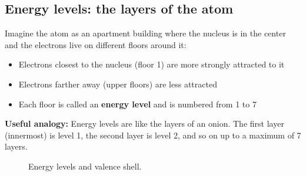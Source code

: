 \subsection{Energy levels: the layers of the atom}
\begin{minipage}{0.45\textwidth}
    Imagine the atom as an apartment building where the nucleus is in the center and the electrons live on different floors around it:
    \begin{itemize}
        \item Electrons closest to the nucleus (floor 1) are more strongly attracted to it
        \item Electrons farther away (upper floors) are less attracted
        \item Each floor is called an \textbf{energy level} and is numbered from 1 to 7
    \end{itemize}
    \begin{remark}
        \textbf{Useful analogy:} Energy levels are like the layers of an onion. The first layer (innermost) is level 1, the second layer is level 2, and so on up to a maximum of 7 layers.
    \end{remark}
\end{minipage}
\hfill
\begin{minipage}{0.45\textwidth}
    \begin{figure}[H]
        \centering
        \caption{Energy levels and valence shell.}
        \label{fig:niveles_capa_de_valencia}
    \end{figure}
\end{minipage}

